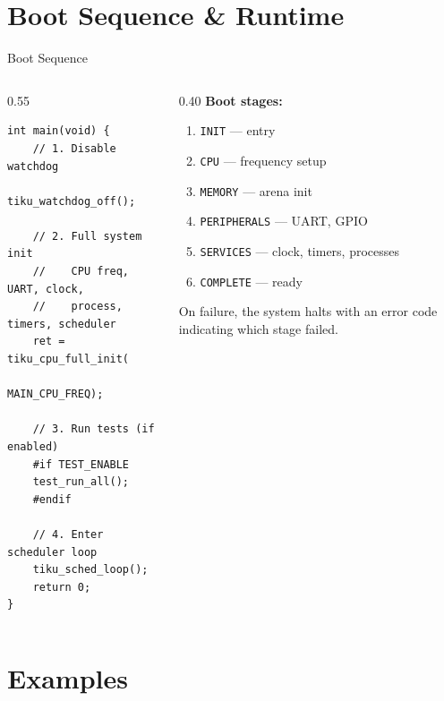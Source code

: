 \documentclass[aspectratio=169, 10pt]{beamer}
\begin{document}
\section{Boot Sequence \& Runtime}

\begin{frame}[fragile]{Boot Sequence}
\begin{columns}[T]
\begin{column}{0.55\textwidth}
\begin{lstlisting}[style=cstyle, title={main.c (simplified)}]
int main(void) {
    // 1. Disable watchdog
    tiku_watchdog_off();

    // 2. Full system init
    //    CPU freq, UART, clock,
    //    process, timers, scheduler
    ret = tiku_cpu_full_init(
              MAIN_CPU_FREQ);

    // 3. Run tests (if enabled)
    #if TEST_ENABLE
    test_run_all();
    #endif

    // 4. Enter scheduler loop
    tiku_sched_loop();
    return 0;
}
\end{lstlisting}
\end{column}
\begin{column}{0.40\textwidth}
\textbf{Boot stages:}
\begin{enumerate}
  \item \texttt{INIT} — entry
  \item \texttt{CPU} — frequency setup
  \item \texttt{MEMORY} — arena init
  \item \texttt{PERIPHERALS} — UART, GPIO
  \item \texttt{SERVICES} — clock, timers, processes
  \item \texttt{COMPLETE} — ready
\end{enumerate}

\vspace{0.5em}
On failure, the system halts with an error code indicating which stage failed.
\end{column}
\end{columns}
\end{frame}

\section{Examples}
\end{document}
